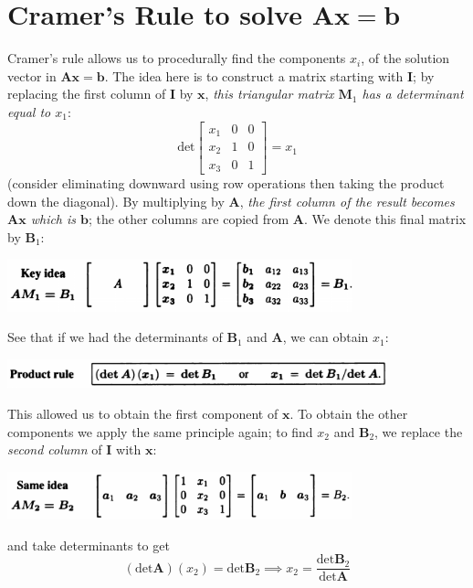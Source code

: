 \documentclass{report}
\begin{document}
\section{Cramer's Rule to solve $\bm{Ax}=\bm b$}
Cramer's rule allows us to procedurally find the components $x_i$, of the solution vector in $\bm{Ax}=\bm b$. The idea here is 
to construct a matrix starting with $\bm I$; by replacing the first column of 
$\bm I$ by $\bm x$, \textit{this triangular matrix $\bm M_1$ has a determinant equal to $x_1$}:
\begin{equation*}
\text{det}\left[\begin{array}{ccc}
x_1&0&0\\
x_2&1&0\\
x_3&0&1
\end{array}\right]=x_1
\end{equation*}
(consider eliminating downward using row operations then taking the product down the diagonal). By multiplying by $\bm A$, 
\textit{the first column of the result becomes $\bm{Ax}$
which is $\bm b$}; the other columns are copied from $\bm A$. We denote this final matrix by $\bm B_1$:
\begin{center}
\includegraphics[width=10cm]{101}
\end{center}
See that if we had the determinants of $\bm B_1$ and $\bm A$, we can obtain $x_1$:
\begin{center}
\includegraphics[width=11cm]{102}
\end{center}
This allowed us to obtain the first component of $\bm x$. To obtain the other components we apply the same principle again; to find $x_2$ and $\bm B_2$, we replace the 
\textit{second column} of $\bm I$ with $\bm x$:
\begin{center}
\includegraphics[width=10cm]{103}
\end{center}
and take determinants to get
\begin{equation*}
(\text{det}\bm A)(x_2)=\text{det}\bm B_2\implies x_2=\frac{\text{det}\bm B_2}{\text{det}\bm A}
\end{equation*}
\end{document}
